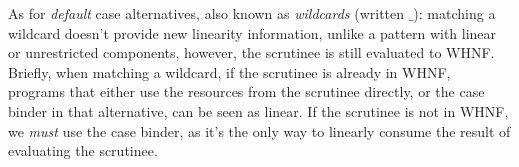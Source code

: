 \documentclass[acmsmall,review,anonymous,screen]{acmart}
\begin{document}


As for \emph{default} case alternatives, also known as \emph{wildcards}
(written $\_$): matching a wildcard doesn't provide new linearity information,
unlike a pattern with linear or unrestricted components, however, the
scrutinee is still evaluated to WHNF.
%
%
Briefly, when matching a wildcard, if the scrutinee is already in WHNF,
programs that either use the resources from the scrutinee directly, or the case
binder in that alternative, can be seen as linear. If the scrutinee is not in
WHNF, we \emph{must} use the case binder, as it's the only way to linearly
consume the result of evaluating the scrutinee.
\end{document}
